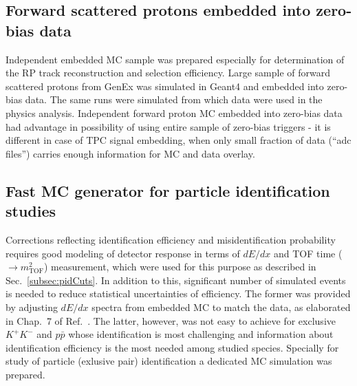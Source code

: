 \subsection{Forward scattered protons embedded into zero-bias data}

Independent embedded MC sample was prepared especially for determination of the RP track reconstruction and selection efficiency. Large sample of forward scattered protons from GenEx was simulated in Geant4 and embedded into zero-bias data. The same runs were simulated from which data were used in the physics analysis. Independent forward proton MC embedded into zero-bias data had advantage in possibility of using entire sample of zero-bias triggers - it is different in case of TPC signal embedding, when only small fraction of data (``adc files'') carries enough information for MC and data overlay.


\subsection{Fast MC generator for particle identification studies}
Corrections reflecting identification efficiency and misidentification probability requires good modeling of detector response in terms of $dE/dx$ and TOF time ($\rightarrow m^{2}_{\text{TOF}}$) measurement, which were used for this purpose as described in Sec.~\ref{subsec:pidCuts}. In addition to this, significant number of simulated events is needed to reduce statistical uncertainties of efficiency. The former was provided by adjusting $dE/dx$ spectra from embedded MC to match the data, as elaborated in Chap.~7 of Ref.~\cite{supplementaryNote}. The latter, however, was not easy to achieve for exclusive $K^{+}K^{-}$ and $p\bar{p}$ whose identification is most challenging and information about identification efficiency is the most needed among studied species. Specially for study of particle (exlusive pair) identification a dedicated MC simulation was prepared.

